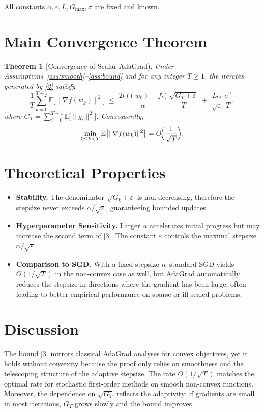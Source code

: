 \documentclass{article}
\newtheorem{theorem}{Theorem}
\newcommand{\E}{\mathbb{E}}
\begin{document}
All constants $\alpha,\varepsilon,L,G_{\max},\sigma$ are fixed and known.

\section*{Main Convergence Theorem}
\begin{theorem}[Convergence of Scalar AdaGrad]\label{thm:main}
Under Assumptions~\ref{ass:smooth}–\ref{ass:bound} and for any integer $T\ge1$, the iterates generated by \eqref{2} satisfy
\[
\frac{1}{T}\sum_{k=0}^{T-1}\E\bigl[\|\nabla f(w_k)\|^{2}\bigr]
\;\le\;
\frac{2\bigl(f(w_0)-f_*\bigr)}{\alpha}\,
\frac{\sqrt{G_T+\varepsilon}}{T}
\;+\;
\frac{L\alpha}{\sqrt{\varepsilon}}\,
\frac{\sigma^{2}}{T},
\tag{3}
\]
where $G_T=\sum_{i=0}^{T-1}\E\bigl[\|g_i\|^{2}\bigr]$.
Consequently,
\[
\min_{0\le k<T}\E\bigl[\|\nabla f(w_k)\|^{2}\bigr]
= O\!\Bigl(\frac{1}{\sqrt{T}}\Bigr).
\]
\end{theorem}

\section*{Theoretical Properties}
\begin{itemize}[nosep]
    \item \textbf{Stability.} The denominator $\sqrt{G_k+\varepsilon}$ is non‑decreasing, therefore the stepsize never exceeds $\alpha/\sqrt{\varepsilon}$, guaranteeing bounded updates.
    \item \textbf{Hyperparameter Sensitivity.} Larger $\alpha$ accelerates initial progress but may increase the second term of \eqref{3}. The constant $\varepsilon$ controls the maximal stepsize $\alpha/\sqrt{\varepsilon}$.
    \item \textbf{Comparison to SGD.} With a fixed stepsize $\eta$, standard SGD yields $O(1/\sqrt{T})$ in the non‑convex case as well, but AdaGrad automatically reduces the stepsize in directions where the gradient has been large, often leading to better empirical performance on sparse or ill‑scaled problems.
\end{itemize}

\section*{Discussion}
The bound \eqref{3} mirrors classical AdaGrad analyses for convex objectives, yet it holds without convexity because the proof only relies on smoothness and the telescoping structure of the adaptive stepsize. The rate $O(1/\sqrt{T})$ matches the optimal rate for stochastic first‑order methods on smooth non‑convex functions. Moreover, the dependence on $\sqrt{G_T}$ reflects the adaptivity: if gradients are small in most iterations, $G_T$ grows slowly and the bound improves.
\end{document}
